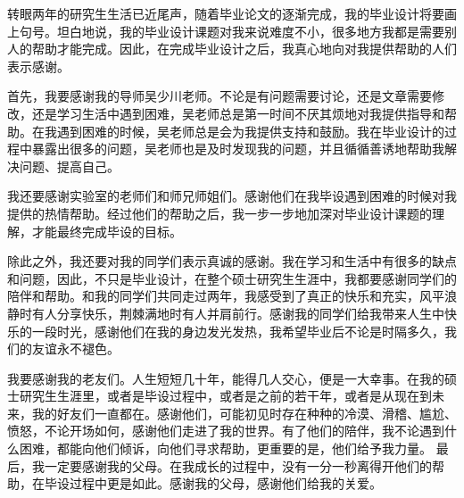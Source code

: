 \begin{acknowledgements}
转眼两年的研究生生活已近尾声，随着毕业论文的逐渐完成，我的毕业设计将要画上句号。坦白地说，我的毕业设计课题对我来说难度不小，很多地方我都是需要别人的帮助才能完成。因此，在完成毕业设计之后，我真心地向对我提供帮助的人们表示感谢。

首先，我要感谢我的导师吴少川老师。不论是有问题需要讨论，还是文章需要修改，还是学习生活中遇到困难，吴老师总是第一时间不厌其烦地对我提供指导和帮助。在我遇到困难的时候，吴老师总是会为我提供支持和鼓励。我在毕业设计的过程中暴露出很多的问题，吴老师也是及时发现我的问题，并且循循善诱地帮助我解决问题、提高自己。

我还要感谢实验室的老师们和师兄师姐们。感谢他们在我毕设遇到困难的时候对我提供的热情帮助。经过他们的帮助之后，我一步一步地加深对毕业设计课题的理解，才能最终完成毕设的目标。

除此之外，我还要对我的同学们表示真诚的感谢。我在学习和生活中有很多的缺点和问题，因此，不只是毕业设计，在整个硕士研究生生涯中，我都要感谢同学们的陪伴和帮助。和我的同学们共同走过两年，我感受到了真正的快乐和充实，风平浪静时有人分享快乐，荆棘满地时有人并肩前行。感谢我的同学们给我带来人生中快乐的一段时光，感谢他们在我的身边发光发热，我希望毕业后不论是时隔多久，我们的友谊永不褪色。

我要感谢我的老友们。人生短短几十年，能得几人交心，便是一大幸事。在我的硕士研究生生涯里，或者是毕设过程中，或者是之前的若干年，或者是从现在到未来，我的好友们一直都在。感谢他们，可能初见时存在种种的冷漠、滑稽、尴尬、愤怒，不论开场如何，感谢他们走进了我的世界。有了他们的陪伴，我不论遇到什么困难，都能向他们倾诉，向他们寻求帮助，更重要的是，他们给予我力量。
最后，我一定要感谢我的父母。在我成长的过程中，没有一分一秒离得开他们的帮助，在毕设过程中更是如此。感谢我的父母，感谢他们给我的关爱。


\end{acknowledgements}
